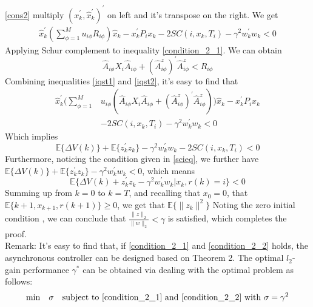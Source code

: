 \documentclass[conference]{IEEEtran}
\begin{document}
\eqref{cons2} multiply $(x^{'}_k,\hat{x}^{'}_{k})^{'}$ on left and it's transpose on the right. We get\\
\begin{equation} \label{iqst1}
	\begin{split}
		\hat{x}^{'}_{k}(\sum_{\phi=1}^{M}u_{i\phi}R_{i\phi})\hat{x}_k-x^{'}_{k}P_{i}x_{k}-2SC(i,x_k,T_i)-\gamma^{2}w^{'}_{k}w_{k}<0
	\end{split}
\end{equation}
Applying Schur complement to inequality \eqref{condition_2_1}. We can obtain \\
\begin{equation} \label{iqst2}
\hat{A}_{i\phi}X_{i}\hat{A}_{i\phi}+(\hat{A}^{z}_{i\phi})^{'}\hat{A}^{z}_{i\phi}<R_{i\phi}
\end{equation}
Combining inequalities \eqref{iqst1} and \eqref{iqst2}, it's easy to find that \\
\begin{equation} \label{leq222}
	\begin{split}
		\hat{x}^{'}_{k}\Big(\sum_{\phi=1}^{M}&u_{i\phi}(\hat{A}_{i\phi}X_{i}\hat{A}_{i\phi}+(\hat{A}^{z}_{i\phi})^{'}\hat{A}^{z}_{i\phi})\Big)\hat{x}_k-x^{'}_{k}P_{i}x_{k}\\
		&-2SC(i,x_k,T_i)-\gamma^{2}w^{'}_{k}w_{k}<0
	\end{split}
\end{equation}
Which implies 
\begin{equation} \label{eq31}
	\mathbb{E}\{\varDelta V(k)\}+\mathbb{E}\{z^{'}_{k}z_{k}\}-\gamma^{2}w^{'}_{k}w_{k}-2SC(i,x_k,T_i)<0
\end{equation}
Furthermore, noticing the condition given in \eqref{scieq}, we further have $\mathbb{E}\{\varDelta V(k)\}+\mathbb{E}\{z^{'}_{k}z_{k}\}-\gamma^{2}w^{'}_{k}w_{k}<0$, which means
\begin{equation}
	\mathbb{E}\{\varDelta V(k)+z^{'}_{k}z_{k}-\gamma^{2}w^{'}_{k}w_{k}|x_{k},r(k)=i \}<0
\end{equation}
Summing up from $k=0$ to $k=T$, and recalling that $x_{0} =0$, that $\mathbb{E}\{k+1,x_{k+1},r(k+1)\}\geq0 $, we get that $\mathbb{E}\{ \|z_{k}\|^{2} \} $ Noting the zero initial condition , we can conclude that $\frac{\|z\|_{2}}{\|w\|_2}<\gamma $ is satisfied, which completes the proof. \\
Remark: It's easy to find that, if \eqref{condition_2_1} and \eqref{condition_2_2} holds, the asynchronous controller can be designed based on Theorem 2. The optimal $l_2$-gain performance $\gamma^{*}$ can be obtained via dealing with the optimal problem as follows: \\ 
\begin{equation}
	\mathrm{min}\quad \sigma \quad \mathrm{subject \ to} \ \eqref{condition_2_1} \ \mathrm{and} \ \eqref{condition_2_2} \ \mathrm{with} \ \sigma=\gamma^{2} 
\end{equation}
\end{document}
